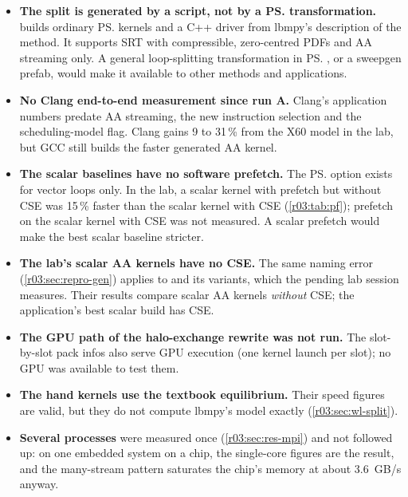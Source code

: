 \begin{itemize}
  \item \textbf{The split is generated by a script, not by a \ps{} transformation.}
         builds ordinary \ps{} kernels and a C++ driver from lbmpy's
        description of the method. It supports SRT with compressible, zero-centred PDFs and AA
        streaming only. A general loop-splitting transformation in \ps{}, or a sweepgen prefab,
        would make it available to other methods and applications.
  \item \textbf{No Clang end-to-end measurement since run A.} Clang's application numbers
        predate AA streaming, the new instruction selection and the scheduling-model flag. Clang
        gains 9 to 31\,\% from the X60 model in the lab, but GCC still builds the faster
        generated AA kernel.
  \item \textbf{The scalar baselines have no software prefetch.} The \ps{} option exists for
        vector loops only. In the lab, a scalar kernel with prefetch but without CSE was 15\,\%
        faster than the scalar kernel with CSE (\cref{r03:tab:pf}); prefetch on the scalar kernel
        with CSE was not measured. A scalar prefetch would make the best scalar baseline
        stricter.
  \item \textbf{The lab's scalar AA kernels have no CSE.} The same naming error
        (\cref{r03:sec:repro-gen}) applies to  and its
        variants, which the pending lab session measures. Their results compare scalar AA kernels
        \emph{without} CSE; the application's best scalar build has CSE.
  \item \textbf{The GPU path of the halo-exchange rewrite was not run.} The slot-by-slot pack
        infos also serve GPU execution (one kernel launch per slot); no GPU was available to test
        them.
  \item \textbf{The hand kernels use the textbook equilibrium.} Their speed figures are valid,
        but they do not compute lbmpy's model exactly (\cref{r03:sec:wl-split}).
  \item \textbf{Several processes} were measured once (\cref{r03:sec:res-mpi}) and not
        followed up: on one embedded system on a chip, the single-core figures are the result,
        and the many-stream pattern saturates the chip's memory at about 3.6~GB/s anyway.
\end{itemize}
